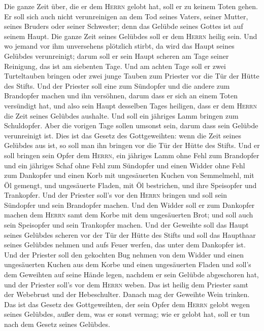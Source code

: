  Die ganze Zeit über, die er dem \textsc{Herrn} gelobt
hat, soll er zu keinem Toten gehen.  Er soll sich auch
nicht verunreinigen an dem Tod seines Vaters, seiner Mutter, seines
Bruders oder seiner Schwester; denn das Gelübde seines Gottes ist auf
seinem Haupt.  Die ganze Zeit seines Gelübdes soll er dem
\textsc{Herrn} heilig sein.  Und wo jemand vor ihm
unversehens plötzlich stirbt, da wird das Haupt seines Gelübdes
verunreinigt; darum soll er sein Haupt scheren am Tage seiner Reinigung,
das ist am siebenten Tage.  Und am achten Tage soll er
zwei Turteltauben bringen oder zwei junge Tauben zum Priester vor die
Tür der Hütte des Stifts.  Und der Priester soll eine zum
Sündopfer und die andere zum Brandopfer machen und ihn versöhnen, darum
dass er sich an einem Toten versündigt hat, und also sein Haupt
desselben Tages heiligen,  dass er dem \textsc{Herrn} die
Zeit seines Gelübdes aushalte. Und soll ein jähriges Lamm bringen zum
Schuldopfer. Aber die vorigen Tage sollen umsonst sein, darum dass sein
Gelübde verunreinigt ist.  Dies ist das Gesetz des
Gottgeweihten: wenn die Zeit seines Gelübdes aus ist, so soll man ihn
bringen vor die Tür der Hütte des Stifts.  Und er soll
bringen sein Opfer dem \textsc{Herrn}, ein jähriges Lamm ohne Fehl zum
Brandopfer und ein jähriges Schaf ohne Fehl zum Sündopfer und einen
Widder ohne Fehl zum Dankopfer  und einen Korb mit
ungesäuerten Kuchen von Semmelmehl, mit Öl gemengt, und ungesäuerte
Fladen, mit Öl bestrichen, und ihre Speisopfer und Trankopfer.
 Und der Priester soll's vor den \textsc{Herrn} bringen
und soll sein Sündopfer und sein Brandopfer machen.  Und
den Widder soll er zum Dankopfer machen dem \textsc{Herrn} samt dem
Korbe mit dem ungesäuerten Brot; und soll auch sein Speisopfer und sein
Trankopfer machen.  Und der Geweihte soll das Haupt
seines Gelübdes scheren vor der Tür der Hütte des Stifts und soll das
Haupthaar seines Gelübdes nehmen und aufs Feuer werfen, das unter dem
Dankopfer ist.  Und der Priester soll den gekochten Bug
nehmen von dem Widder und einen ungesäuerten Kuchen aus dem Korbe und
einen ungesäuerten Fladen und soll's dem Geweihten auf seine Hände
legen, nachdem er sein Gelübde abgeschoren hat,  und der
Priester soll's vor dem \textsc{Herrn} weben. Das ist heilig dem
Priester samt der Webebrust und der Hebeschulter. Danach mag der
Geweihte Wein trinken.  Das ist das Gesetz des
Gottgeweihten, der sein Opfer dem \textsc{Herrn} gelobt wegen seines
Gelübdes, außer dem, was er sonst vermag; wie er gelobt hat, soll er tun
nach dem Gesetz seines Gelübdes.

